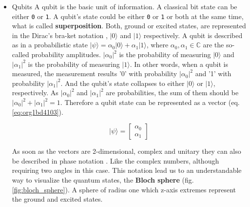 \begin{itemize}
\item Qubits
\label{sec:org9033970}
A qubit is the basic unit of information.
A classical bit state can be either \texttt{0} or \texttt{1}.
A qubit's state could be either \texttt{0} or \texttt{1} or both at the same time, what is called \textbf{superposition}.
Both, ground or excited states, are represented in the Dirac's bra-ket notation \cite{Nielsen_2009}, \(| 0 \rangle\) and \(| 1 \rangle\) respectively.
A qubit is described as in a probabilistic state \(| \psi \rangle = \alpha_0 | 0 \rangle + \alpha_1 | 1 \rangle\), where \(\alpha_0, \alpha_1 \in \mathbb{C}\) are the so-called probability amplitudes.
\(|\alpha_0|^2\) is the probability of measuring \(| 0 \rangle\) and \(|\alpha_1|^2\) is the probability of measuring \(| 1 \rangle\).
In other words, when a qubit is measured, the measurement results '0' with probability \(|\alpha_0|^2\) and '1' with probability \(|\alpha_1|^2\).
And the qubit's state collapses to either \(| 0 \rangle\) or \(| 1 \rangle\), respectively.
As \(|\alpha_0|^2\) and \(|\alpha_1|^2\)  are probabilities, the sum of them should be \(|\alpha_0|^2 + |\alpha_1|^2 = 1\).
Therefore a qubit state can be represented as a vector (eq. \ref{eq:org1bd4103}).

\begin{equation}
\label{eq:org1bd4103}
|\psi\rangle = \begin{bmatrix}\alpha_0 \\ \alpha_1 \end{bmatrix}
\end{equation}

As soon as the vectors are 2-dimensional, complex and unitary they can also be described in phase notation \cite{Nielsen_2009}.
Like the complex numbers, although requiring two angles in this case.
This notation lead us to an understandable way to visualize the quantum states, the \textbf{Bloch sphere} (fig. \ref{fig:bloch_sphere}).
A sphere of radius one which z-axis extremes represent the ground and excited states.


\end{itemize}
